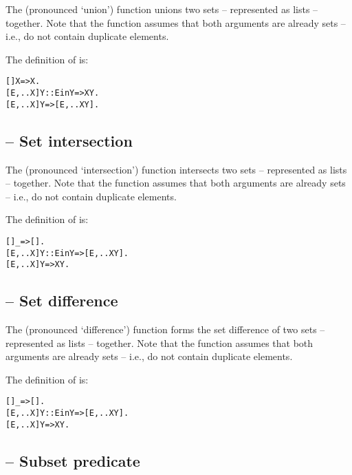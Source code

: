 The \q{\union} (pronounced `union') function unions two sets -- represented as lists -- together. Note that the \union function assumes that both arguments are already sets -- i.e., do not contain duplicate elements.

The definition of \q{\union} is:
\begin{alltt}
[]\union{}X=>X.
[E,..X]\union{}Y :: E in Y => X\union{}Y.
[E,..X]\union{}Y => [E,..X\union{}Y].
\end{alltt}

\subsection{\texorpdfstring{\function{\intersection} -- }{}Set intersection}
\label{stdlib:intersection}

The \q{\intersection} (pronounced `intersection') function intersects two sets -- represented as lists -- together. Note that the \intersection function assumes that both arguments are already sets -- i.e., do not contain duplicate elements.

The definition of \q{\intersection} is:
\begin{alltt}
[]\intersection{}\_=>[].
[E,..X]\intersection{}Y :: E in Y=> [E,..X\intersection{}Y].
[E,..X]\intersection{}Y => X\intersection{}Y.
\end{alltt}

\subsection{\texorpdfstring{\function{\difference} -- }{}Set difference}
\label{stdlib:difference}

The \q{\difference} (pronounced `difference') function forms the set difference of two sets -- represented as lists -- together. Note that the \difference function assumes that both arguments are already sets -- i.e., do not contain duplicate elements.

The definition of \q{\difference} is:
\begin{alltt}
[]\difference{}\_=>[].
[E,..X]\difference{}Y :: \nasf{}E in Y => [E,..X\difference{}Y].
[E,..X]\difference{}Y => X\difference{}Y.
\end{alltt}

\subsection{\texorpdfstring{ -- }{}Subset predicate}
\label{setlib:subset}

